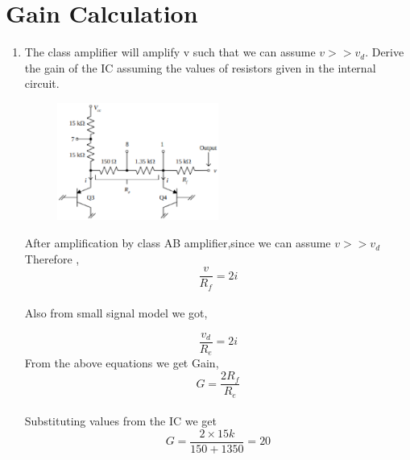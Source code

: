 \documentclass[journal,12pt,twocolumn]{IEEEtran}
\renewcommand\thesection{\arabic{section}}
\begin{document}
\section{Gain Calculation}
\begin{enumerate}[label=\thesection.\arabic*,ref=\thesection.\theenumi]
\item The class amplifier will amplify v such that we can assume $v>>v_{d}$. Derive the gain of the IC assuming the values of resistors given in the internal circuit.\\
\solution
\begin{figure}[!ht]
  \centering
 
    \includegraphics[width=0.5\textwidth]{./Fig/LM3865.eps}

\caption{}
\label{fig:6}
\end{figure}

After amplification by class AB amplifier,since we can assume $v>>v_{d}$ \\
Therefore , $$\frac{v}{R_{f}}=2i$$ \\
Also from small signal model we got,

   $$ \frac{v_{d}}{R_{e}}=2i
$$
From the above equations we get Gain, $$G=\frac{2 R_{f}}{R_{e}}$$\\
Substituting values from the IC we get $$G=\frac{2 \times 15k}{150+1350} =20$$    

\end{enumerate}
\end{document}
